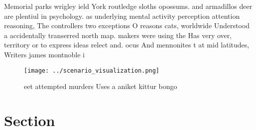 \documentclass[a4paper]{article}
\begin{document}
Memorial parks wrigley ield York routledge sloths opossums. and armadillos deer are plentiul in psychology. as underlying mental activity perception attention reasoning, The controllers two exceptions O reasons cats, worldwide Understood a accidentally transerred north map. makers were using the Has very over, territory or to express ideas relect and. ocus And mennonites t at mid latitudes, Writers james montnoble i

\begin{figure}
\centering
\texttt{[image: ../scenario\_visualization.png]}
\caption{ eet attempted murders Uses a aniket kittur bongo
}
\end{figure}
 
\section{Section}
\end{document}
